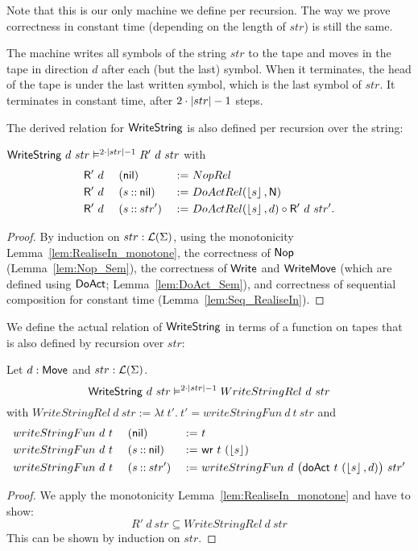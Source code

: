 Note that this is our only machine we define per recursion.  The way we prove correctness in constant time (depending on the length of $str$) is still
the same.

The machine writes all symbols of the string $str$ to the tape and moves in the tape in direction $d$ after each (but the last) symbol.  When it
terminates, the head of the tape is under the last written symbol, which is the last symbol of $str$.  It terminates in constant time, after
$2\cdot\left| str \right|-1$ steps.

The derived relation for $\mathsf{WriteString}$ is also defined per recursion over the string:
\begin{lemma}
  $\mathsf{WriteString}~d~str \mathrel{\vDash^{2 \cdot \left| str \right| - 1}} R'~d~str$ with
  \begin{alignat*}{3}
    &\mathsf{R'}~d~&&(\mathsf{nil}        ) &~:=~& NopRel \\
    &\mathsf{R'}~d~&&(s \mathbin{::} \mathsf{nil}) &~:=~& DoActRel(\left\lfloor {s} \right\rfloor, \mathsf{N}) \\
    &\mathsf{R'}~d~&&(s \mathbin{::} str') &~:=~& DoActRel(\left\lfloor {s} \right\rfloor, d) \circ \mathsf{R'}~d~str'.
  \end{alignat*}
\end{lemma}
\begin{proof}
  By induction on $str:\mathcal{L}(\Sigma)$, using the monotonicity Lemma~\ref{lem:RealiseIn_monotone}, the correctness of $\mathsf{Nop}$ (Lemma~\ref{lem:Nop_Sem}),
  the correctness of $\mathsf{Write}$ and $\mathsf{WriteMove}$ (which are defined using $\mathsf{DoAct}$; Lemma~\ref{lem:DoAct_Sem}), and correctness of
  sequential composition for constant time (Lemma~\ref{lem:Seq_RealiseIn}).
\end{proof}

We define the actual relation of $\mathsf{WriteString}$ in terms of a function on tapes that is also defined by recursion over $str$:
\begin{lemma}
  \label{lem:WriteString_Sem}
  Let $d:\mathsf{Move}$ and $str:\mathcal{L}(\Sigma)$.
  \[ \mathsf{WriteString}~d~str \mathrel{\vDash^{2\cdot\left| str \right|-1}} WriteStringRel~d~str \]
  with
  $WriteStringRel~d~str := \lambda t~t'.~t' = writeStringFun~d~t~str$ and
  \begin{alignat*}{3}
    &writeStringFun~d~t~&&(\mathsf{nil}        ) &~:=~& t \\
    &writeStringFun~d~t~&&(s \mathbin{::} \mathsf{nil}) &~:=~& \mathsf{wr}~t~(\left\lfloor {s} \right\rfloor) \\
    &writeStringFun~d~t~&&(s \mathbin{::} str') &~:=~& writeStringFun~d~\bigl(\mathsf{doAct}~t~(\left\lfloor {s} \right\rfloor, d)\bigr)~str'
  \end{alignat*}
\end{lemma}
\begin{proof}
  We apply the monotonicity Lemma~\ref{lem:RealiseIn_monotone} and have to show:
  \[
    R'~d~str \subseteq WriteStringRel~d~str
  \]
  This can be shown by induction on $str$.
\end{proof}


